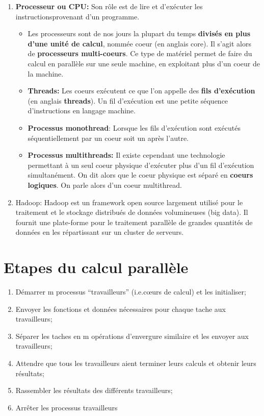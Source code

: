 \documentclass[
]{article}
\begin{document}
\begin{enumerate}
\def\labelenumi{\arabic{enumi}.}
\item
  \textbf{Processeur ou CPU:} Son rôle est de lire et d'exécuter les
  instructionsprovenant d'un programme.

  \begin{itemize}
  \item
    Les processeurs sont de nos jours la plupart du temps
    \textbf{divisés en plus d'une unité de calcul}, nommée coeur (en
    anglais core). Il s'agit alors de \textbf{processeurs multi-coeurs}.
    Ce type de matériel permet de faire du calcul en parallèle sur une
    seule machine, en exploitant plus d'un coeur de la machine.
  \item
    \textbf{Threads:} Les coeurs exécutent ce que l'on appelle des
    \textbf{fils d'exécution} (en anglais \textbf{threads}). Un fil
    d'exécution est une petite séquence d'instructions en langage
    machine.
  \item
    \textbf{Processus monothread}: Lorsque les fils d'exécution sont
    exécutés séquentiellement par un coeur soit un après l'autre.
  \item
    \textbf{Processus multithreads:} Il existe cependant une technologie
    permettant à un seul coeur physique d'exécuter plus d'un fil
    d'exécution simultanément. On dit alors que le coeur physique est
    séparé en \textbf{coeurs logiques}. On parle alors d'un coeur
    multithread.
  \end{itemize}
\item Hadoop: Hadoop est un framework open source largement utilisé pour le traitement et le stockage distribués de données volumineuses (big data). Il fournit une plate-forme pour le traitement parallèle de grandes quantités de données en les répartissant sur un cluster de serveurs.
\end{enumerate}

\hypertarget{etapes-du-calcul-paralluxe8le}{%
\section{Etapes du calcul
parallèle}\label{etapes-du-calcul-paralluxe8le}}

\begin{enumerate}
\def\labelenumi{\arabic{enumi}.}
\item
  Démarrer m processus ``travailleurs'' (i.e.cœurs de calcul) et les
  initialiser;
\item
  Envoyer les fonctions et données nécessaires pour chaque tache aux
  travailleurs;
\item
  Séparer les taches en m opérations d'envergure similaire et les
  envoyer aux travailleurs;
\item
  Attendre que tous les travailleurs aient terminer leurs calculs et
  obtenir leurs résultats;
\item
  Rassembler les résultats des différents travailleurs;
\item
  Arrêter les processus travailleurs
\end{enumerate}
\end{document}
